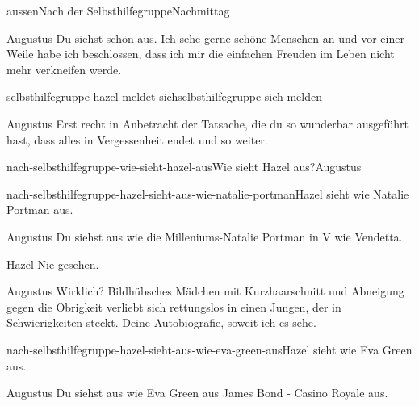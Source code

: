 \documentclass[12pt]{article}
\begin{document}
\begin{scene}[cut to]{aussen}{Nach der Selbsthilfegruppe}{Nachmittag}
        \begin{dialog}{Augustus}
            Du siehst schön aus.
            Ich sehe gerne schöne Menschen an und vor einer Weile habe ich beschlossen, dass ich mir die einfachen Freuden im Leben nicht mehr verkneifen werde.
        \end{dialog}


        \begin{conditional}{selbsthilfegruppe-hazel-meldet-sich}{selbsthilfegruppe-sich-melden}
            \begin{dialog}{Augustus}
                Erst recht in Anbetracht der Tatsache, die du so wunderbar ausgeführt hast, dass alles in Vergessenheit endet und so weiter.
            \end{dialog}
        \end{conditional}

        \begin{decision}{nach-selbsthilfegruppe-wie-sieht-hazel-aus}{Wie sieht \gls{Hazel} aus?}{\gls{Augustus}}
            \begin{option}{nach-selbsthilfegruppe-hazel-sieht-aus-wie-natalie-portman}{\gls{Hazel} sieht wie Natalie Portman aus.}
                \begin{dialog}{Augustus}
                    Du siehst aus wie die Milleniums-Natalie Portman in V wie Vendetta.
                \end{dialog}

                \begin{dialog}{Hazel}
                    Nie gesehen.
                \end{dialog}

                \begin{dialog}{Augustus}
                    Wirklich?
                    Bildhübsches Mädchen mit Kurzhaarschnitt und Abneigung gegen die Obrigkeit verliebt sich rettungslos in einen Jungen, der in Schwierigkeiten steckt.
                    Deine Autobiografie, soweit ich es sehe.
                \end{dialog}
            \end{option}
            \begin{option}{nach-selbsthilfegruppe-hazel-sieht-aus-wie-eva-green-aus}{\gls{Hazel} sieht wie Eva Green aus.}
                \begin{dialog}{Augustus}
                    Du siehst aus wie Eva Green aus James Bond - Casino Royale aus.
                \end{dialog}


\end{option}
\end{decision}
\end{scene}
\end{document}
